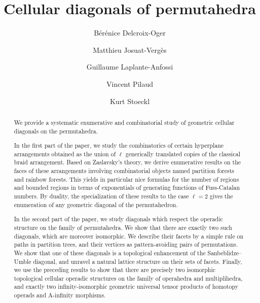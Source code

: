 \documentclass{amsart}
\title{Cellular diagonals of permutahedra}
\author[B. Delcroix-Oger]{B\'er\'enice Delcroix-Oger}
\author[M. Josuat-Verg\`es]{Matthieu Josuat-Verg\`es}
\author[G. Laplante-Anfossi]{Guillaume Laplante-Anfossi}
\author[V. Pilaud]{Vincent Pilaud}
\author[K. Stoeckl]{Kurt Stoeckl}
\newcommand{\Guillaume}[1]{\todo[color=magenta!30]{\rm #1 \\ \hfill --- G.}}
\theoremstyle{definition}
\begin{document}
\begin{abstract}
We provide a systematic enumerative and combinatorial study of geometric cellular diagonals on the permutahedra. 

In the first part of the paper, we study the combinatorics of certain hyperplane arrangements obtained as the union of $\ell$ generically translated copies of the classical braid arrangement.
Based on Zaslavsky's theory, we derive enumerative results on the faces of these arrangements involving combinatorial objects named partition forests and rainbow forests.
This yields in particular nice formulas for the number of regions and bounded regions in terms of exponentials of generating functions of Fuss-Catalan numbers.
By duality, the specialization of these results to the case $\ell = 2$ gives the enumeration of any geometric diagonal of the permutahedron.

In the second part of the paper, we study diagonals which respect the operadic structure on the family of permutahedra.
We show that there are exactly two such diagonals, which are moreover isomorphic.
We describe their facets by a simple rule on paths in partition trees, and their vertices as pattern-avoiding pairs of permutations.
We show that one of these diagonals is a topological enhancement of the Sanbeblidze--Umble diagonal, and unravel a natural lattice structure on their sets of facets.
Finally, we use the preceding results to show that there are precisely two isomorphic topological cellular operadic structures on the family of operahedra and multiplihedra, and exactly two infinity-isomorphic geometric universal tensor products of homotopy operads and A-infinity morphisms.
\end{abstract}

\vspace*{-1.2cm}
\maketitle
\end{document}

